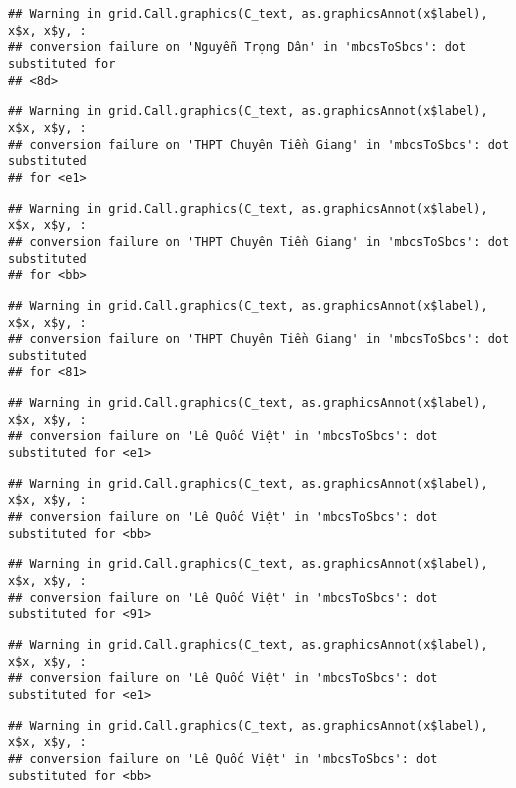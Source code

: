 \documentclass[
]{article}
\begin{document}
\begin{verbatim}
## Warning in grid.Call.graphics(C_text, as.graphicsAnnot(x$label), x$x, x$y, :
## conversion failure on 'Nguyễn Trọng Dân' in 'mbcsToSbcs': dot substituted for
## <8d>
\end{verbatim}

\begin{verbatim}
## Warning in grid.Call.graphics(C_text, as.graphicsAnnot(x$label), x$x, x$y, :
## conversion failure on 'THPT Chuyên Tiền Giang' in 'mbcsToSbcs': dot substituted
## for <e1>
\end{verbatim}

\begin{verbatim}
## Warning in grid.Call.graphics(C_text, as.graphicsAnnot(x$label), x$x, x$y, :
## conversion failure on 'THPT Chuyên Tiền Giang' in 'mbcsToSbcs': dot substituted
## for <bb>
\end{verbatim}

\begin{verbatim}
## Warning in grid.Call.graphics(C_text, as.graphicsAnnot(x$label), x$x, x$y, :
## conversion failure on 'THPT Chuyên Tiền Giang' in 'mbcsToSbcs': dot substituted
## for <81>
\end{verbatim}

\begin{verbatim}
## Warning in grid.Call.graphics(C_text, as.graphicsAnnot(x$label), x$x, x$y, :
## conversion failure on 'Lê Quốc Việt' in 'mbcsToSbcs': dot substituted for <e1>
\end{verbatim}

\begin{verbatim}
## Warning in grid.Call.graphics(C_text, as.graphicsAnnot(x$label), x$x, x$y, :
## conversion failure on 'Lê Quốc Việt' in 'mbcsToSbcs': dot substituted for <bb>
\end{verbatim}

\begin{verbatim}
## Warning in grid.Call.graphics(C_text, as.graphicsAnnot(x$label), x$x, x$y, :
## conversion failure on 'Lê Quốc Việt' in 'mbcsToSbcs': dot substituted for <91>
\end{verbatim}

\begin{verbatim}
## Warning in grid.Call.graphics(C_text, as.graphicsAnnot(x$label), x$x, x$y, :
## conversion failure on 'Lê Quốc Việt' in 'mbcsToSbcs': dot substituted for <e1>
\end{verbatim}

\begin{verbatim}
## Warning in grid.Call.graphics(C_text, as.graphicsAnnot(x$label), x$x, x$y, :
## conversion failure on 'Lê Quốc Việt' in 'mbcsToSbcs': dot substituted for <bb>
\end{verbatim}
\end{document}
